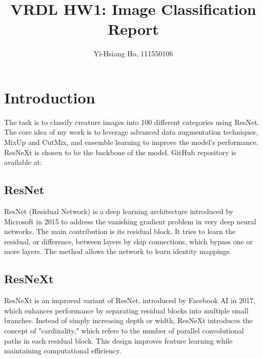 \documentclass[10pt,twocolumn,letterpaper]{article}
\begin{document}
\title{VRDL HW1: Image Classification Report}

\author{Yi-Hsiang Ho, 111550106
}
\maketitle

\section{Introduction}
\label{sec:intro}

The task is to classify creature images into 100 different categories using ResNet.
The core idea of my work is to leverage advanced data augmentation techniques,
MixUp and CutMix, and ensemble learning to improve the model's performance. ResNeXt
is chosen to be the backbone of the model. GitHub repository is available
at: 

\subsection{ResNet}

ResNet (Residual Network) is a deep learning architecture introduced by Microsoft
in 2015 to address the vanishing gradient problem in very deep neural networks.
The main contribution is its residual block. It tries to learn the residual, or
difference, between layers by skip connections, which bypass one or more layers.
The method allows the network to learn identity mappings.

\subsection{ResNeXt}

ResNeXt is an improved variant of ResNet, introduced by Facebook AI in 2017,
which enhances performance by separating residual blocks into multiple small
branches. Instead of simply increasing depth or width, ResNeXt introduces the
concept of "cardinality," which refers to the number of parallel convolutional
paths in each residual block. This design improves feature learning while
maintaining computational efficiency.~\cite{Xie2016}
\end{document}
